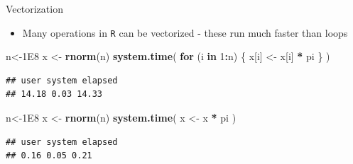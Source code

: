 \documentclass[ignorenonframetext,]{beamer}
\newenvironment{Shaded}{\begin{snugshade}}{\end{snugshade}}
\newcommand{\KeywordTok}[1]{\textcolor[rgb]{0.13,0.29,0.53}{\textbf{#1}}}
\newcommand{\DecValTok}[1]{\textcolor[rgb]{0.00,0.00,0.81}{#1}}
\newcommand{\FloatTok}[1]{\textcolor[rgb]{0.00,0.00,0.81}{#1}}
\newcommand{\StringTok}[1]{\textcolor[rgb]{0.31,0.60,0.02}{#1}}
\newcommand{\ControlFlowTok}[1]{\textcolor[rgb]{0.13,0.29,0.53}{\textbf{#1}}}
\newcommand{\OperatorTok}[1]{\textcolor[rgb]{0.81,0.36,0.00}{\textbf{#1}}}
\newcommand{\NormalTok}[1]{#1}
\providecommand{\tightlist}{%
  \setlength{\itemsep}{0pt}\setlength{\parskip}{0pt}}
\begin{document}
\begin{frame}[fragile]{Vectorization}

\begin{itemize}[<+->]
\tightlist
\item
  Many operations in \texttt{R} can be vectorized - these run much
  faster than loops
\end{itemize}

\begin{Shaded}
\begin{Highlighting}[]
\NormalTok{n<-}\FloatTok{1E8}
\NormalTok{x <-}\StringTok{ }\KeywordTok{rnorm}\NormalTok{(n)}
\KeywordTok{system.time}\NormalTok{(}
  \ControlFlowTok{for}\NormalTok{ (i }\ControlFlowTok{in} \DecValTok{1}\OperatorTok{:}\NormalTok{n) \{}
\NormalTok{    x[i] <-}\StringTok{ }\NormalTok{x[i] }\OperatorTok{*}\StringTok{ }\NormalTok{pi}
\NormalTok{  \}}
\NormalTok{)}
\end{Highlighting}
\end{Shaded}

\begin{verbatim}
## user system elapsed
## 14.18 0.03 14.33
\end{verbatim}

\end{frame}

\begin{frame}[fragile]

\begin{Shaded}
\begin{Highlighting}[]
\NormalTok{n<-}\FloatTok{1E8}
\NormalTok{x <-}\StringTok{ }\KeywordTok{rnorm}\NormalTok{(n)}
\KeywordTok{system.time}\NormalTok{(}
\NormalTok{  x <-}\StringTok{ }\NormalTok{x }\OperatorTok{*}\StringTok{ }\NormalTok{pi}
\NormalTok{)}
\end{Highlighting}
\end{Shaded}

\begin{verbatim}
## user system elapsed
## 0.16 0.05 0.21
\end{verbatim}

\end{frame}
\end{document}
